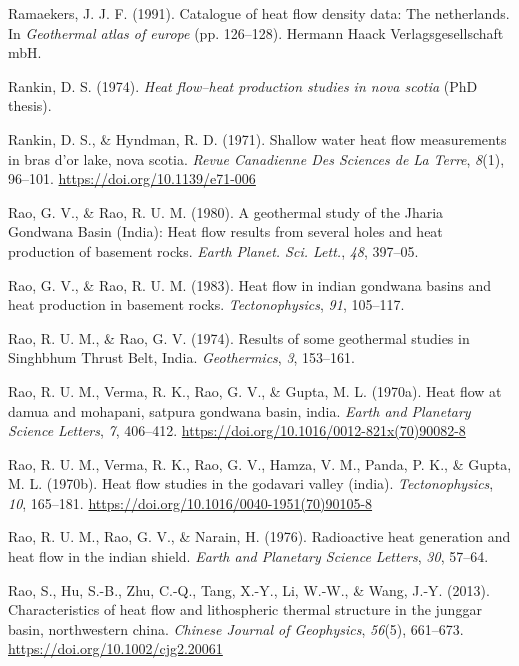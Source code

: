 \begin{CSLReferences}{1}{1}
\leavevmode{}%
Ramaekers, J. J. F. (1991). Catalogue of heat flow density data: The netherlands. In \emph{Geothermal atlas of europe} (pp. 126--128). Hermann Haack Verlagsgesellschaft mbH.

\leavevmode{}%
Rankin, D. S. (1974). \emph{Heat flow--heat production studies in nova scotia} (PhD thesis).

\leavevmode{}%
Rankin, D. S., \& Hyndman, R. D. (1971). Shallow water heat flow measurements in bras d'or lake, nova scotia. \emph{Revue Canadienne Des Sciences de La Terre}, \emph{8}(1), 96--101. \url{https://doi.org/10.1139/e71-006}

\leavevmode{}%
Rao, G. V., \& Rao, R. U. M. (1980). A geothermal study of the {Jharia Gondwana Basin (India)}: Heat flow results from several holes and heat production of basement rocks. \emph{Earth Planet. Sci. Lett.}, \emph{48}, 397--05.

\leavevmode{}%
Rao, G. V., \& Rao, R. U. M. (1983). Heat flow in indian gondwana basins and heat production in basement rocks. \emph{Tectonophysics}, \emph{91}, 105--117.

\leavevmode{}%
Rao, R. U. M., \& Rao, G. V. (1974). Results of some geothermal studies in {Singhbhum Thrust Belt, India}. \emph{Geothermics}, \emph{3}, 153--161.

\leavevmode{}%
Rao, R. U. M., Verma, R. K., Rao, G. V., \& Gupta, M. L. (1970a). Heat flow at damua and mohapani, satpura gondwana basin, india. \emph{Earth and Planetary Science Letters}, \emph{7}, 406--412. \url{https://doi.org/10.1016/0012-821x(70)90082-8}

\leavevmode{}%
Rao, R. U. M., Verma, R. K., Rao, G. V., Hamza, V. M., Panda, P. K., \& Gupta, M. L. (1970b). Heat flow studies in the godavari valley (india). \emph{Tectonophysics}, \emph{10}, 165--181. \url{https://doi.org/10.1016/0040-1951(70)90105-8}

\leavevmode{}%
Rao, R. U. M., Rao, G. V., \& Narain, H. (1976). Radioactive heat generation and heat flow in the indian shield. \emph{Earth and Planetary Science Letters}, \emph{30}, 57--64.

\leavevmode{}%
Rao, S., Hu, S.-B., Zhu, C.-Q., Tang, X.-Y., Li, W.-W., \& Wang, J.-Y. (2013). Characteristics of heat flow and lithospheric thermal structure in the junggar basin, northwestern china. \emph{Chinese Journal of Geophysics}, \emph{56}(5), 661--673. \url{https://doi.org/10.1002/cjg2.20061}


\end{CSLReferences}
